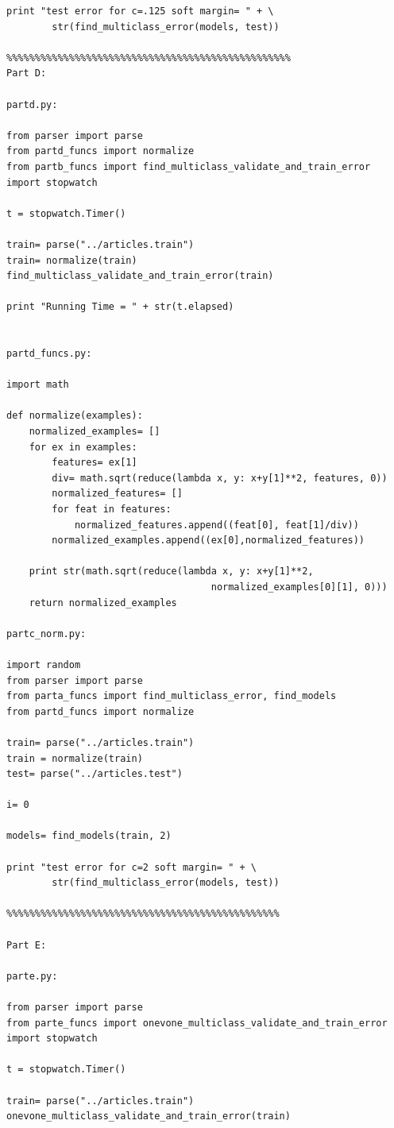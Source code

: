 \documentclass[12pt]{article}
\begin{document}
\begin{lstlisting}
print "test error for c=.125 soft margin= " + \
        str(find_multiclass_error(models, test))

%%%%%%%%%%%%%%%%%%%%%%%%%%%%%%%%%%%%%%%%%%%%%%%%%%
Part D:

partd.py:

from parser import parse
from partd_funcs import normalize
from partb_funcs import find_multiclass_validate_and_train_error
import stopwatch

t = stopwatch.Timer()

train= parse("../articles.train")
train= normalize(train)
find_multiclass_validate_and_train_error(train)

print "Running Time = " + str(t.elapsed)


partd_funcs.py:

import math

def normalize(examples):
    normalized_examples= []
    for ex in examples:
        features= ex[1]
        div= math.sqrt(reduce(lambda x, y: x+y[1]**2, features, 0))
        normalized_features= []
        for feat in features:
            normalized_features.append((feat[0], feat[1]/div))
        normalized_examples.append((ex[0],normalized_features))

    print str(math.sqrt(reduce(lambda x, y: x+y[1]**2,
                                    normalized_examples[0][1], 0)))
    return normalized_examples

partc_norm.py:

import random
from parser import parse
from parta_funcs import find_multiclass_error, find_models
from partd_funcs import normalize

train= parse("../articles.train")
train = normalize(train)
test= parse("../articles.test")

i= 0

models= find_models(train, 2)

print "test error for c=2 soft margin= " + \
        str(find_multiclass_error(models, test))

%%%%%%%%%%%%%%%%%%%%%%%%%%%%%%%%%%%%%%%%%%%%%%%%

Part E:

parte.py: 

from parser import parse
from parte_funcs import onevone_multiclass_validate_and_train_error
import stopwatch

t = stopwatch.Timer()

train= parse("../articles.train")
onevone_multiclass_validate_and_train_error(train)


\end{lstlisting}
\end{document}
